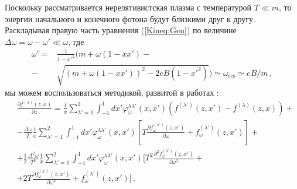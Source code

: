 \documentclass[a4paper]{panl}
\begin{document}
 Поскольку рассматривается нерелятивистская плазма с температурой $T\ll m$, то энергии начального и конечного фотона будут близкими друг к другу.
Раскладывая правую часть уравнения (\ref{Kineq:Gen}) по величине $\Delta\omega=\omega-\omega'\ll\omega$, где
	\begin{equation}
		\begin{aligned}
			\omega' =& \frac{1}{1-x'^2}\bigg(m+\omega(1-x x')-
			\\		
			-& \sqrt{(m+\omega(1-x x'))^2 - 2eB (1-x'^2)}\bigg)\simeq\omega_{\text{res}}\simeq eB/m\, ,
		\end{aligned}
	\end{equation}
мы можем воспользоваться методикой, развитой в работах \cite{Komp,Lubarsk}:
		\begin{equation}\label{eq:KinSerDeltaw}
					\begin{aligned}
			&\frac{\partial f^{(\lambda)}(z,x)}{\partial z} = \frac{1}{x} \sum_{\lambda'=1}^{2} \int_{-1}^{1}dx'\varphi_\omega^{\lambda\lambda'}(x,x') (f^{(\lambda')}(z,x')-f^{(\lambda)}(z,x)) +
			\\
			&- \frac{\Delta \omega}{T}\frac{1}{x} \sum_{\lambda'=1}^{2} \int_{-1}^{1}dx'\varphi_\omega^{\lambda\lambda'}(x,x') 
			\left[
			T \frac{\partial f_\omega^{(\lambda')}(z,x')}{\partial \omega} + f_\omega^{(\lambda')}(z,x')
			\right]+
			\\
			&+ \frac{1}{2}\frac{\Delta^2 \omega}{T^2}\frac{1}{x} \sum_{\lambda'=1}^{2} \int_{-1}^{1}dx'\varphi_\omega^{\lambda\lambda'}(x,x') 
			\bigg[
			T^2 \frac{\partial^2 f_\omega^{(\lambda')}(z,x')}{\partial \omega^2}+
			\\		
			&+ 2T \frac{\partial f_\omega^{(\lambda')}(z,x')}{\partial \omega^2}+f_\omega^{(\lambda')}(z,x')
			\bigg] 
			\,  .
			\end{aligned}
		\end{equation}
\end{document}
